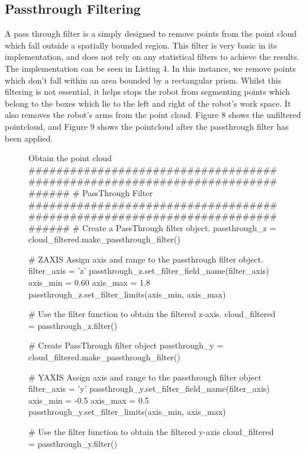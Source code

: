 \documentclass[a4paper]{article}
\begin{document}
\newpage

\subsection{Passthrough Filtering}
A pass through filter is a simply designed to remove points from the point cloud which fall outside a spatially bounded region. This filter is very basic in its implementation, and does not rely on any statistical filters to achieve the results. The implementation can be seen in Listing 4. In this instance, we remove points which don't fall within an area bounded by a rectangular prism. Whilst this filtering is not essential, it helps stops the robot from segmenting points which belong to the boxes which lie to the left and right of the robot's work space. It also removes the robot's arms from the point cloud. Figure 8 shows the unfiltered pointcloud, and Figure 9 shows the pointcloud after the passthrough filter has been applied.

\vspace{1cm}

\begin{figure}[h]\scriptsize
\begin{sexylisting}{Obtain the point cloud}
##############################################################################
    # PassThrough Filter
##############################################################################
    # Create a PassThrough filter object.
    passthrough_z = cloud_filtered.make_passthrough_filter()

    # ZAXIS Assign axis and range to the passthrough filter object.
    filter_axis = 'z'
    passthrough_z.set_filter_field_name(filter_axis)
    axis_min = 0.60
    axis_max = 1.8
    passthrough_z.set_filter_limits(axis_min, axis_max)

    # Use the filter function to obtain the filtered z-axis.
    cloud_filtered = passthrough_z.filter()

    # Create PassThrough filter object
    passthrough_y = cloud_filtered.make_passthrough_filter()

    # YAXIS Assign axis and range to the passthrough filter object
    filter_axis = 'y'
    passthrough_y.set_filter_field_name(filter_axis)
    axis_min = -0.5
    axis_max = 0.5
    passthrough_y.set_filter_limits(axis_min, axis_max)

    # Use the filter function to obtain the filtered y-axis
    cloud_filtered = passthrough_y.filter()
\end{sexylisting}
\end{figure}
\end{document}
